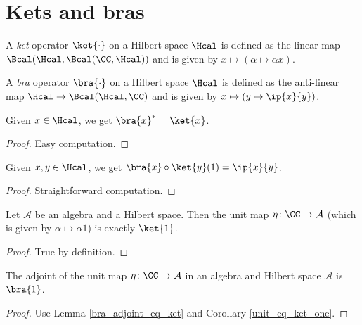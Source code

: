 \section{Kets and bras}
\begin{definition}\label{ket}\leanok
  A \textit{ket} operator $\ket{\cdot}$ on a Hilbert space $\Hcal$ is defined as the linear map $\Bcal(\Hcal,\Bcal(\CC,\Hcal))$ and is given by $x\mapsto(\alpha\mapsto\alpha x)$.
\end{definition}
\begin{definition}\label{bra}\leanok
  A \textit{bra} operator $\bra{\cdot}$ on a Hilbert space $\Hcal$ is defined as the anti-linear map $\Hcal\to\Bcal(\Hcal,\CC)$ and is given by $x\mapsto(y\mapsto\ip{x}{y})$.
\end{definition}
\begin{lemma}\label{bra_adjoint_eq_ket}\leanok
  Given $x\in \Hcal$, we get $\bra{x}^*=\ket{x}$.
\end{lemma}
\begin{proof}\leanok
  Easy computation.
\end{proof}
\begin{corollary}\label{bra-ket}\leanok
  Given $x,y\in\Hcal$, we get $\bra{x}\circ\ket{y}(1)=\ip{x}{y}$.
\end{corollary}
\begin{proof}\leanok
  Straightforward computation.
\end{proof}
\begin{corollary}\label{unit_eq_ket_one}
  \leanok
  Let $\mathcal{A}$ be an algebra and a Hilbert space. Then the unit map $\eta\colon\CC\to\mathcal{A}$ (which is given by $\alpha\mapsto \alpha1$) is exactly $\ket{1}$.
\end{corollary}
\begin{proof}\leanok
  True by definition.
\end{proof}
\begin{corollary}\label{unit_adjoint_eq_bra_one}\leanok
  The adjoint of the unit map $\eta\colon\CC\to\mathcal{A}$ in an algebra and Hilbert space $\mathcal{A}$ is $\bra{1}$.
 \end{corollary}
 \begin{proof}\leanok
  Use Lemma \ref{bra_adjoint_eq_ket} and Corollary \ref{unit_eq_ket_one}.
 \end{proof}
